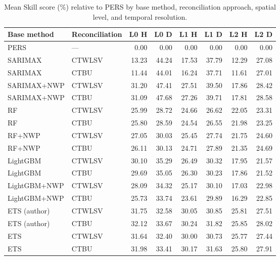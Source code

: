 \begin{table}[htbp]
\centering
\small
\caption{Mean Skill score (\%) relative to PERS by base method, reconciliation approach, spatial level, and temporal resolution.}
\label{tab:skill}
\begin{tabular}{llrrrrrr}
\toprule
Base method & Reconciliation & L0 H & L0 D & L1 H & L1 D & L2 H & L2 D \\
\midrule
PERS & --- & 0.00 & 0.00 & 0.00 & 0.00 & 0.00 & 0.00 \\
\addlinespace
SARIMAX & CTWLSV & 13.23 & 44.24 & 17.53 & 37.79 & 12.29 & 27.08 \\
SARIMAX & CTBU & 11.44 & 44.01 & 16.24 & 37.71 & 11.61 & 27.01 \\
SARIMAX+NWP & CTWLSV & 31.20 & 47.41 & 27.51 & 39.50 & 17.86 & 28.42 \\
SARIMAX+NWP & CTBU & 31.09 & 47.68 & 27.26 & 39.71 & 17.81 & 28.58 \\
\addlinespace
RF & CTWLSV & 25.99 & 28.72 & 24.66 & 26.62 & 22.05 & 23.31 \\
RF & CTBU & 25.80 & 28.59 & 24.54 & 26.55 & 21.98 & 23.25 \\
RF+NWP & CTWLSV & 27.05 & 30.03 & 25.45 & 27.74 & 21.75 & 24.60 \\
RF+NWP & CTBU & 26.11 & 30.13 & 24.71 & 27.89 & 21.35 & 24.69 \\
\addlinespace
LightGBM & CTWLSV & 30.10 & 35.29 & 26.49 & 30.32 & 17.95 & 21.57 \\
LightGBM & CTBU & 29.69 & 35.05 & 26.30 & 30.23 & 17.86 & 21.52 \\
LightGBM+NWP & CTWLSV & 28.09 & 34.32 & 25.17 & 30.10 & 17.03 & 22.98 \\
LightGBM+NWP & CTBU & 25.73 & 33.74 & 23.61 & 29.89 & 16.29 & 22.85 \\
\addlinespace
ETS (author) & CTWLSV & 31.75 & 32.58 & 30.05 & 30.85 & 25.81 & 27.51 \\
ETS (author) & CTBU & 32.12 & 33.67 & 30.24 & 31.82 & 25.85 & 28.02 \\
ETS & CTWLSV & 31.64 & 32.40 & 30.00 & 30.73 & 25.77 & 27.44 \\
ETS & CTBU & 31.98 & 33.41 & 30.17 & 31.63 & 25.80 & 27.91 \\
\bottomrule
\end{tabular}
\end{table}

